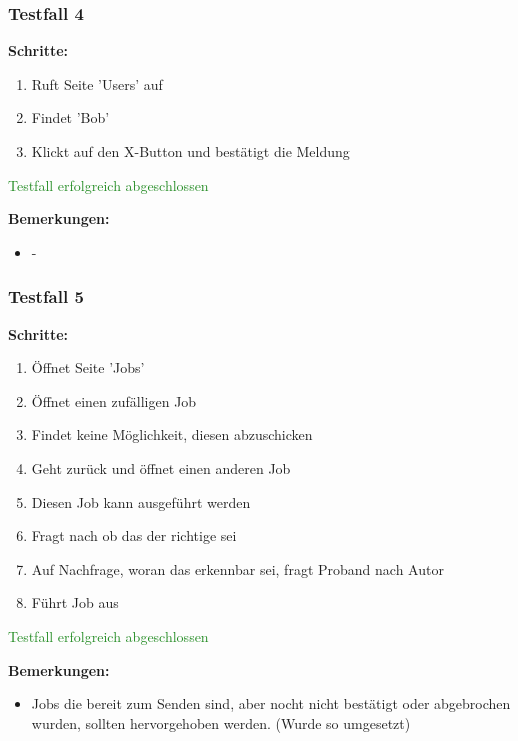 \subsubsection*{Testfall 4}

\textbf{Schritte:}

\begin{enumerate}
    \item Ruft Seite 'Users' auf
    \item Findet 'Bob'
    \item Klickt auf den X-Button und bestätigt die Meldung
\end{enumerate}

\textcolor{ForestGreen}{Testfall erfolgreich abgeschlossen}

\bigskip
\textbf{Bemerkungen:}

\begin{itemize}[noitemsep,nolistsep]
    \item -
\end{itemize}

\subsubsection*{Testfall 5}

\textbf{Schritte:}

\begin{enumerate}
    \item Öffnet Seite 'Jobs'
    \item Öffnet einen zufälligen Job
    \item Findet keine Möglichkeit, diesen abzuschicken
    \item Geht zurück und öffnet einen anderen Job
    \item Diesen Job kann ausgeführt werden
    \item Fragt nach ob das der richtige sei
    \item Auf Nachfrage, woran das erkennbar sei, fragt Proband nach Autor
    \item Führt Job aus
\end{enumerate}

\textcolor{ForestGreen}{Testfall erfolgreich abgeschlossen}

\bigskip
\textbf{Bemerkungen:}

\begin{itemize}[noitemsep,nolistsep]
    \item Jobs die bereit zum Senden sind, aber nocht nicht bestätigt oder abgebrochen wurden, sollten hervorgehoben werden. (Wurde so umgesetzt)
\end{itemize}



